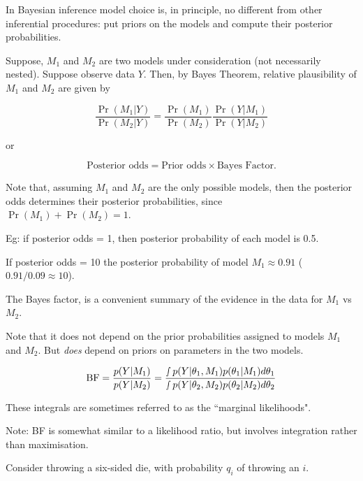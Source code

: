 
\newcommand{\bY}{{\bm{Y}}}
\newcommand{\bX}{{\bm{X}}}
\newcommand{\BF}{\text{BF}}


In Bayesian inference model choice is, in principle, no different
from other inferential procedures: put priors on the models and compute their posterior probabilities.

Suppose, $M_1 $
 and $M_2 $
 are two models under consideration (not necessarily nested).
Suppose  observe data $Y$. Then, by Bayes Theorem, relative plausibility of $M_1$ and $M_2$ are given by

$$\frac{\Pr(M_1 | Y)}{\Pr(M_2 | Y)} = \frac{\Pr(M_1)}{\Pr(M_2)} \frac{\Pr(Y | M_1)}{\Pr(Y | M_2)}$$

or 

$$\text{Posterior odds} = \text{Prior odds} \times \text{Bayes Factor}.$$


Note that, assuming $M_1$ and $M_2$ are the only possible models, then
the posterior odds determines their posterior probabilities, since \\
$\Pr(M_1) + \Pr(M_2) = 1$.

Eg: if posterior odds = 1, then posterior probability of each model is 0.5.

If posterior odds = 10 the posterior probability of model $M_1 \approx  0.91$ ($0.91/0.09 \approx 10$).


The Bayes factor, is a convenient summary of the evidence in the data for $M_1$ vs $M_2$.

Note that it does not depend on the prior probabilities assigned to models
$M_1$ and $M_2$. But {\it does} depend on priors on parameters in the two models.

$$\BF = \frac{{p(Y  |M_1)}}{{p(Y  | M_2)}} =  \frac{{\smallint p(Y|\theta _1 ,M_1 )p(\theta _1 |M_1
)d\theta _1 }}{{\smallint p(Y|\theta _2 ,M_2 )p(\theta _2 |M_2
)d\theta _2 }}$$

These integrals are sometimes referred to as the ``marginal likelihoods".

Note: BF is somewhat similar to a likelihood ratio, but involves integration rather than maximisation.


Consider throwing a six-sided die, with probability $q_i$ of throwing an $i$.

